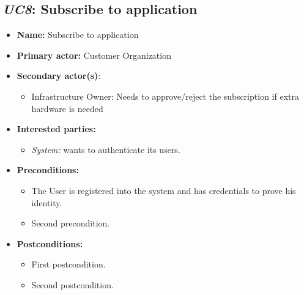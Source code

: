 \documentclass[english,peerreview]{sareport}
\begin{document}
\subsection{\emph{UC8}: Subscribe to application}
\begin{itemize}
    \item \textbf{Name:} Subscribe to application
    \item \textbf{Primary actor:} Customer Organization
    \item \textbf{Secondary actor(s)}: 
	\begin{itemize}
		\item Infrastructure Owner: Needs to approve/reject the subscription if extra hardware is needed
	\end{itemize}
    \item \textbf{Interested parties:} 
        \begin{itemize}
            \item \textit{System:} wants to authenticate its users.
        \end{itemize}

    \item \textbf{Preconditions:}
        \begin{itemize}
            \item The User is registered into the system and has credentials to prove his identity.
            \item Second precondition.
        \end{itemize}

    \item \textbf{Postconditions:}
        \begin{itemize}
            \item First postcondition.
            \item Second postcondition.
        \end{itemize}
        

\end{itemize}
\end{document}
